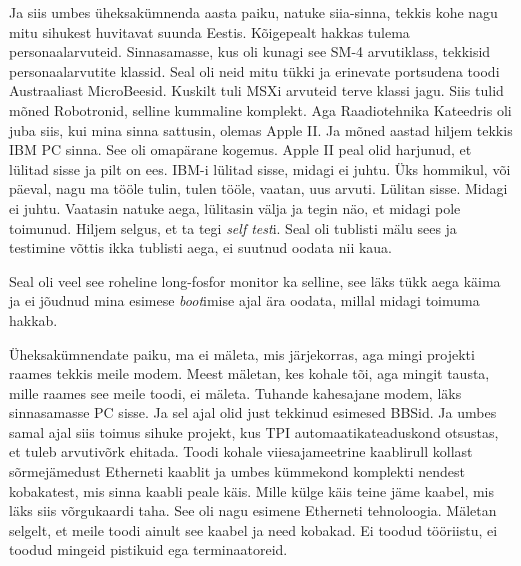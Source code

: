 Ja siis umbes üheksakümnenda aasta paiku, natuke siia-sinna, tekkis kohe nagu 
mitu sihukest huvitavat suunda Eestis. Kõigepealt hakkas tulema 
personaalarvuteid. Sinnasamasse, kus oli kunagi see SM-4 arvutiklass, tekkisid 
personaalarvutite klassid. Seal oli  neid mitu tükki ja erinevate portsudena 
toodi Austraaliast MicroBeesid. Kuskilt tuli MSXi 
arvuteid terve klassi jagu. Siis tulid mõned 
Robotronid, selline kummaline komplekt. 
Aga Raadiotehnika Kateedris oli juba siis, kui mina sinna sattusin, olemas 
Apple II. Ja mõned aastad hiljem tekkis IBM 
PC sinna. See oli omapärane kogemus. Apple II peal olid 
harjunud, et lülitad sisse ja pilt on ees. IBM-i lülitad sisse, midagi ei 
juhtu. Üks hommikul, või päeval, nagu ma tööle tulin, tulen tööle, vaatan, uus 
arvuti. Lülitan sisse. Midagi ei juhtu. Vaatasin natuke aega, lülitasin välja 
ja tegin näo, et midagi pole toimunud. Hiljem selgus, et ta tegi \emph{self 
test}i. Seal oli tublisti mälu sees ja testimine võttis ikka tublisti aega, ei 
suutnud oodata nii kaua. 


Seal oli veel see roheline long-fosfor monitor ka selline, see läks tükk 
aega käima ja ei jõudnud mina esimese \emph{boot}imise ajal ära oodata, millal 
midagi toimuma hakkab.

Üheksakümnendate paiku, ma ei mäleta, mis järjekorras, aga mingi projekti 
raames tekkis meile modem. Meest mäletan, kes kohale tõi, aga mingit tausta, 
mille raames see meile toodi, ei mäleta. Tuhande kahesajane modem, läks 
sinnasamasse PC sisse. Ja sel ajal olid just tekkinud esimesed BBSid. 
Ja umbes samal ajal siis toimus sihuke projekt, kus TPI 
automaatikateaduskond 
otsustas, et tuleb arvutivõrk ehitada. Toodi kohale viiesajameetrine kaablirull 
kollast sõrmejämedust Etherneti kaablit ja umbes kümmekond komplekti nendest 
kobakatest, mis sinna kaabli peale käis. Mille külge käis teine jäme kaabel, 
mis läks siis võrgukaardi taha. See oli nagu esimene Etherneti tehnoloogia. 
Mäletan selgelt, et meile toodi ainult see kaabel ja need kobakad. Ei toodud 
tööriistu, ei toodud mingeid pistikuid ega terminaatoreid.

